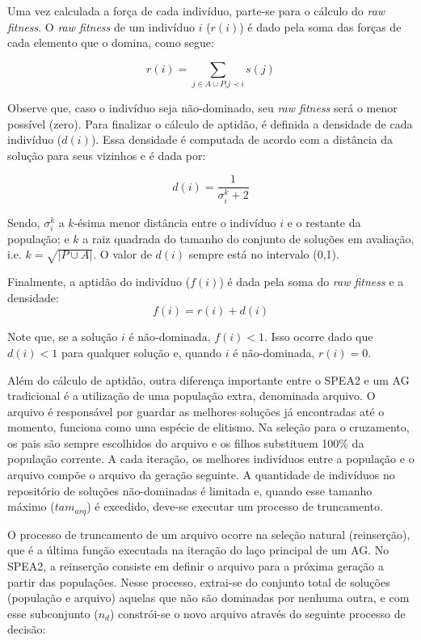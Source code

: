 Uma vez calculada a força de cada indivíduo, parte-se para o cálculo do \textit{raw fitness}. O \textit{raw fitness} de um indivíduo $i$ ($r(i)$) é dado pela soma das forças de cada elemento que o domina, como segue:

\begin{equation}r(i) = \sum_{j \in A \cup P | j \prec i} s(j)\end{equation}

Observe que, caso o indivíduo seja não-dominado, seu \textit{raw fitness} será o menor possível (zero). Para finalizar o cálculo de aptidão, é definida a densidade de cada indivíduo ($d(i)$). Essa densidade é computada de acordo com a distância da solução para seus vizinhos e é dada por:

\begin{equation}d(i) = \frac{1}{\sigma_i^k + 2}\end{equation}

Sendo, $\sigma_i^k$ a $k$-ésima menor distância entre o indivíduo $i$ e o restante da população; e $k$ a raiz quadrada do tamanho do conjunto de soluções em avaliação, i.e. $k = \sqrt{|P \cup A|}$. O valor de $d(i)$ sempre está no intervalo (0,1).

Finalmente, a aptidão do indivíduo ($f(i)$) é dada pela soma do \textit{raw fitness} e a densidade: 
\begin{equation}f(i) = r(i) + d(i)\end{equation}

Note que, se a solução $i$ é não-dominada, $f(i) < 1$. Isso ocorre dado que $d(i) < 1$ para qualquer solução e, quando $i$ é não-dominada, $r(i) = 0$.


Além do cálculo de aptidão, outra diferença importante entre o SPEA2 e um AG tradicional é a utilização de uma população extra, denominada arquivo. O arquivo é responsável por guardar as melhores soluções já encontradas até o momento, funciona como uma espécie de elitismo. Na seleção para o cruzamento, os pais são sempre escolhidos do arquivo e os filhos substituem 100\% da população corrente. A cada iteração, os melhores indivíduos entre a população e o arquivo compõe o arquivo da geração seguinte. A quantidade de indivíduos no repositório de soluções não-dominadas é limitada e, quando esse tamanho máximo ($tam_{arq}$) é excedido, deve-se executar um processo de truncamento.

O processo de truncamento de um arquivo ocorre na seleção natural (reinserção), que é a última função executada na iteração do laço principal de um AG. No SPEA2, a reinserção consiste em definir o arquivo para a próxima geração a partir das populações. Nesse processo, extrai-se do conjunto total de soluções (população e arquivo) aquelas que não são dominadas por nenhuma outra, e com esse subconjunto ($n_d$) constrói-se o novo arquivo através do seguinte processo de decisão:

